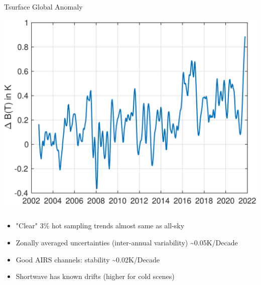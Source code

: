 \documentclass[10pt,t]{beamer}
\begin{document}
\begin{frame}
\begin{columns}
\begin{column}{0.5\columnwidth}
\begin{block}{\footnotesize Tsurface Global Anomaly}
\vspace{-0.05in}
\begin{center}
\includegraphics[width=\linewidth]{SunClimate2022/global_bt1231_anomaly.pdf}
\end{center}
\end{block}
\end{column}
\end{columns}

\vspace{-0.1in}
\small
\begin{itemize}
\item "Clear" 3\% hot sampling trends almost same as all-sky
\item Zonally averaged uncertainties (inter-annual variability) \textasciitilde{}0.05K/Decade
\item Good AIRS channels: stability \textasciitilde{}0.02K/Decade
\item Shortwave has known drifts (higher for cold scenes)
\end{itemize}
\end{frame}
\end{document}
